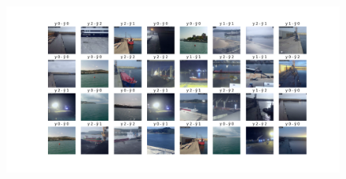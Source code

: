\documentclass{article}
\begin{document}
\begin{figure}[H]
\begin{minipage}{0.7\textwidth}
        \includegraphics[width=\linewidth]{../ultimas_figuras/GRID__A_False_P_False_D_True_MLP_True_efficientnet_b4.png}
    \end{minipage}
\end{figure}
\end{document}
